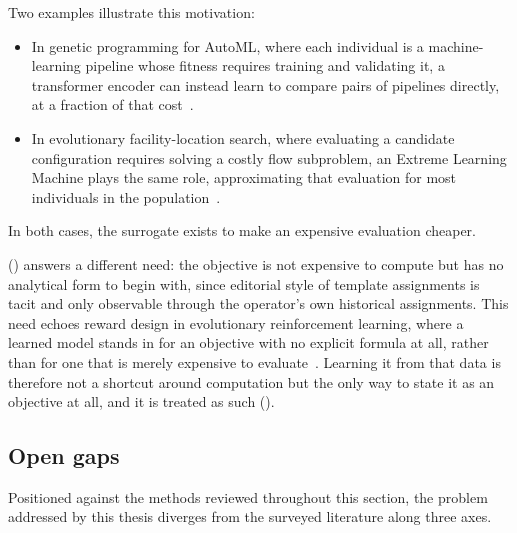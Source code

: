 Two examples illustrate this motivation:
\begin{itemize}
    \item In genetic programming for AutoML, where each individual is a machine-learning pipeline whose fitness requires training and validating it, a transformer encoder can instead learn to compare pairs of pipelines directly, at a fraction of that cost~\cite{teixeira-2025}.
    \item In evolutionary facility-location search, where evaluating a candidate configuration requires solving a costly flow subproblem, an Extreme Learning Machine plays the same role, approximating that evaluation for most individuals in the population~\cite{guo-2017}. 
\end{itemize}
In both cases,  the surrogate exists to make an expensive evaluation cheaper.

\neuralmethod () answers a different need: the objective is not expensive to compute but has no analytical form to begin with, since editorial style of template assignments is tacit and only observable through the operator's own historical assignments. This need echoes reward design in evolutionary reinforcement learning, where a learned model stands in for an objective with no explicit formula at all, rather than for one that is merely expensive to evaluate~\cite{li-2024}. Learning it from that data is therefore not a shortcut around computation but the only way to state it as an objective at all, and it is treated as such ().

\subsection{Open gaps}
\label{sec:sota-pagegen-gaps}

Positioned against the methods reviewed throughout this section, the problem addressed by this thesis diverges from the surveyed literature along three axes.

